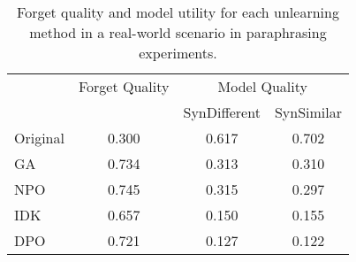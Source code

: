 \setlength{\tabcolsep}{2.5pt}
\small
\begin{table}
\centering
\begin{tabular}{l c c c}
\hline
 & Forget Quality & \multicolumn{2}{c}{Model Quality} \\
\cline{3-4}
 & & SynDifferent & SynSimilar \\
\hline
Original & 0.300 & 0.617 & 0.702 \\
GA       & 0.734 & 0.313 & 0.310 \\
NPO      & 0.745 & 0.315 & 0.297 \\
IDK      & 0.657 & 0.150 & 0.155 \\
DPO      & 0.721 & 0.127 & 0.122 \\
\hline
\end{tabular}
\caption{Forget quality and model utility for each unlearning method in a real-world scenario in paraphrasing experiments.}
\end{table}